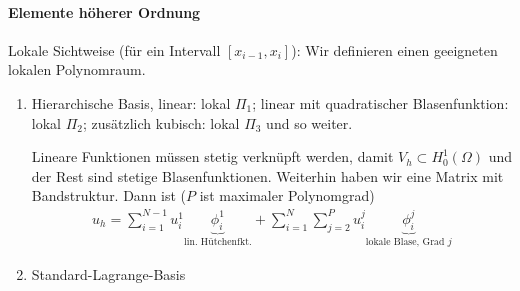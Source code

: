 \paragraph{Elemente höherer Ordnung}
Lokale Sichtweise (für ein Intervall $[x_{i-1}, x_{i}]$): Wir definieren einen geeigneten lokalen Polynomraum.
\begin{enumerate}
\item Hierarchische Basis, linear: lokal $\Pi_{1}$; linear mit quadratischer Blasenfunktion: lokal $\Pi_{2}$; zusätzlich kubisch: lokal $\Pi_{3}$ und so weiter. 

Lineare Funktionen müssen stetig verknüpft werden, damit $V_{h} \subset H_{0}^{1}(\Omega)$ und der Rest sind stetige Blasenfunktionen. Weiterhin haben wir eine Matrix mit Bandstruktur. Dann ist ($P$ ist maximaler Polynomgrad)
\begin{align*}
  u_{h} =  \sum_{i = 1}^{N-1} u^{1}_{i} \underbrace{\phi_{i}^{1}}_{\text{lin. Hütchenfkt.}} + \sum_{i = 1}^{N} \sum_{j = 2}^{P} u_{i}^{j} \underbrace{\phi_{i}^{j}}_{\text{lokale Blase, Grad }j}
\end{align*}

\item Standard-Lagrange-Basis
\end{enumerate}


